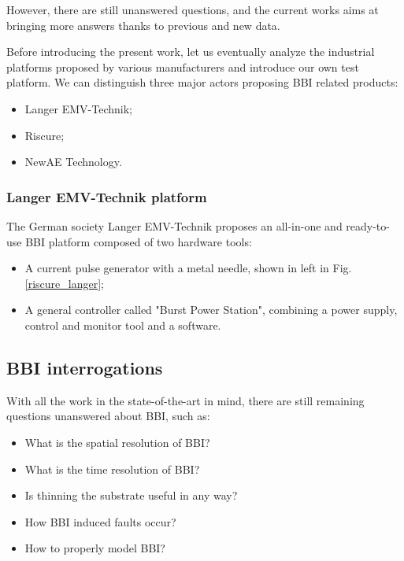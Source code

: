 		However, there are still unanswered questions, and the current works aims at bringing more answers thanks to previous and new data.

		Before introducing the present work, let us eventually analyze the industrial platforms proposed by various manufacturers and introduce our own test platform.
		We can distinguish three major actors proposing BBI related products:
		\begin{itemize}
			\item Langer EMV-Technik;
			\item Riscure;
			\item NewAE Technology.
		\end{itemize}

		
		\subsubsection{Langer EMV-Technik platform}
			The German society Langer EMV-Technik proposes an all-in-one and ready-to-use BBI platform composed of two hardware tools:
			\begin{itemize}
				\item A current pulse generator with a metal needle, shown in left in Fig. \ref{riscure_langer};
				\item A general controller called "Burst Power Station", combining a power supply, control and monitor tool and a software.
			\end{itemize}

	\subsection{BBI interrogations}
		With all the work in the state-of-the-art in mind, there are still remaining questions unanswered about BBI, such as:
		\begin{itemize}
			\item What is the spatial resolution of BBI?
			\item What is the time resolution of BBI?
			\item Is thinning the substrate useful in any way?
			\item How BBI induced faults occur?
			\item How to properly model BBI?
		\end{itemize}
